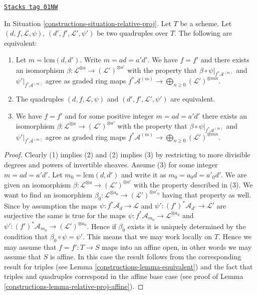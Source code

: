 \begin{lemma}
\label{constructions-lemma-equivalent-relative}
\href{https://stacks.math.columbia.edu/tag/01NW}{\texttt{Stacks tag 01NW}}

In Situation \ref{constructions-situation-relative-proj}.
Let $T$ be a scheme.
Let $(d, f, \mathcal{L}, \psi)$, $(d', f', \mathcal{L}', \psi')$
be two quadruples over $T$. The following are equivalent:
\begin{enumerate}
\item Let $m = \text{lcm}(d, d')$. Write $m = ad = a'd'$.
We have $f = f'$ and there exists
an isomorphism
$\beta : \mathcal{L}^{\otimes a} \to (\mathcal{L}')^{\otimes a'}$
with the property that $\beta \circ \psi|_{f^*\mathcal{A}^{(m)}}$
and $\psi'|_{f^*\mathcal{A}^{(m)}}$ agree
as graded ring maps
$f^*\mathcal{A}^{(m)} \to \bigoplus_{n \geq 0} (\mathcal{L}')^{\otimes mn}$.
\item The quadruples $(d, f, \mathcal{L}, \psi)$ and
$(d', f', \mathcal{L}', \psi')$ are equivalent.
\item We have $f = f'$ and
for some positive integer $m = ad = a'd'$ there exists an isomorphism
$\beta : \mathcal{L}^{\otimes a} \to (\mathcal{L}')^{\otimes a'}$
with the property that $\beta \circ \psi|_{f^*\mathcal{A}^{(m)}}$
and $\psi'|_{f^*\mathcal{A}^{(m)}}$ agree
as graded ring maps
$f^*\mathcal{A}^{(m)} \to \bigoplus_{n \geq 0} (\mathcal{L}')^{\otimes mn}$.
\end{enumerate}
\end{lemma}

\begin{proof}

Clearly (1) implies (2) and (2) implies (3) by restricting to
more divisible degrees and powers of invertible sheaves.
Assume (3) for some integer $m = ad = a'd'$. Let
$m_0 = \text{lcm}(d, d')$ and write it as $m_0 = a_0d = a'_0d'$.
We are given an isomorphism
$\beta : \mathcal{L}^{\otimes a} \to (\mathcal{L}')^{\otimes a'}$
with the property described in (3). We want to find an isomorphism
$\beta_0 : \mathcal{L}^{\otimes a_0} \to (\mathcal{L}')^{\otimes a'_0}$
having that property as well.
Since by assumption the maps $\psi : f^*\mathcal{A}_d \to \mathcal{L}$
and $\psi' : (f')^*\mathcal{A}_{d'} \to \mathcal{L}'$ are surjective the
same is true for the maps
$\psi : f^*\mathcal{A}_{m_0} \to \mathcal{L}^{\otimes a_0}$
and $\psi' : (f')^*\mathcal{A}_{m_0} \to (\mathcal{L}')^{\otimes a_0}$.
Hence if $\beta_0$ exists it is uniquely determined by the
condition that $\beta_0 \circ \psi = \psi'$. This means that
we may work locally on $T$. Hence we may assume that
$f = f' : T \to S$ maps into an affine open, in other words
we may assume that $S$ is affine. In this case the result follows
from the corresponding result for triples (see Lemma \ref{constructions-lemma-equivalent})
and the fact that triples and quadruples correspond in the
affine base case (see proof of Lemma \ref{constructions-lemma-relative-proj-affine}).
\end{proof}

